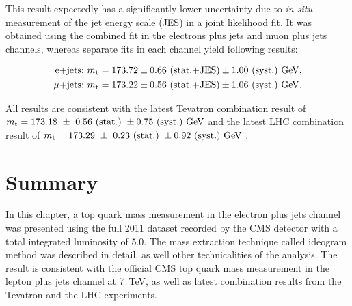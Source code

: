 This result expectedly has a significantly lower uncertainty due to \textit{in situ} measurement of the jet energy scale
(JES) in a joint likelihood fit. It was obtained using the combined fit in the electrons plus jets and muon plus jets
channels, whereas separate fits in each channel yield following results:

\begin{equation}
\begin{split}
	\textrm{e+jets:}~m_\mathrm{t} = 173.72 \pm 0.66~\textrm{(stat.+JES)} \pm 1.00~\textrm{(syst.)}~\textrm{GeV},\\
	\mu\textrm{+jets:}~m_\mathrm{t} = 173.22 \pm 0.56~\textrm{(stat.+JES)} \pm 1.06~\textrm{(syst.)}~\textrm{GeV}.\\
	\label{final_result_official_emujets}
\end{split}
\end{equation}

All results are consistent with the latest Tevatron combination result of $m_\mathrm{t} = 173.18\ \pm\ 0.56\ \textrm{(stat.)}\
\pm 0.75\ \textrm{(syst.)}\ \textrm{GeV}$ \autocite{tevatron_top_mass_combination} and the latest LHC combination result
of $m_\mathrm{t} = 173.29\ \pm\ 0.23\ \textrm{(stat.)}\ \pm 0.92\ \textrm{(syst.)}\ \textrm{GeV}$
\autocite{LHC_top_mass_combination}.


\newpage
\section{Summary}
\label{s_top_mass:summary}

In this chapter, a top quark mass measurement in the electron plus jets channel was presented using the full 2011
dataset recorded by the CMS detector with a total integrated luminosity of \SI{5.0}{\fbinv}. The mass extraction
technique called ideogram method was described in detail, as well other technicalities of the analysis. The result is
consistent with the official CMS top quark mass measurement in the lepton plus jets channel at \SI{7}{\TeV}, as well as
latest combination results from the Tevatron and the LHC experiments.





